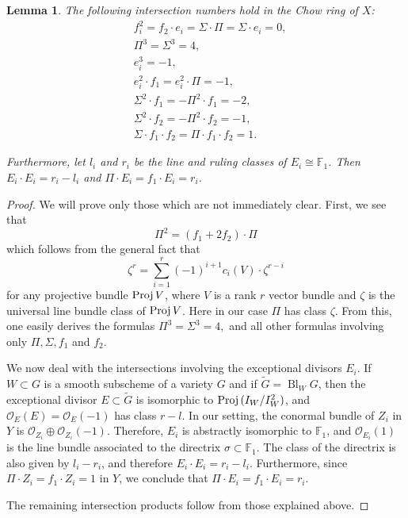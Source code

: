 \documentclass[11]{amsart}
\theoremstyle{plain}
\newtheorem{lemma}[theorem]{Lemma}
\theoremstyle{definition}
\newcommand{\OO}{\mathcal O}
\newcommand{\wt}{\widetilde}
\newcommand{\Bl}{\operatorname{Bl}}
\newcommand{\bbF}{\mathbb F}
\begin{document}
 \begin{lemma}\label{intersections}
 The following intersection numbers hold in the Chow ring of $X$: 
 \begin{eqnarray}\label{eq_int}
 & f_{i}^{2} = f_{2} \cdot e_{i} = \Sigma \cdot \Pi = \Sigma \cdot e_{i} =  0, \nonumber \\
 & \Pi^{3} = \Sigma^{3} = 4, \nonumber \\
 &  e_{i}^{3} = -1, \nonumber \\
 & e_{i}^2 \cdot f_{1} = e_{i}^2 \cdot \Pi = -1, \\ 
 &  \Sigma^2 \cdot f_{1} = -\Pi^2 \cdot f_{1} = -2, \nonumber \\
 &  \Sigma^2 \cdot f_{2} = -\Pi^2 \cdot f_{2} = -1, \nonumber \\
 &   \Sigma \cdot f_{1} \cdot f_{2} = \Pi \cdot f_{1} \cdot f_{2} = 1. \nonumber
 \end{eqnarray}
 
 Furthermore, let $l_{i}$ and $r_{i}$ be the line and ruling classes of $E_{i} \cong \bbF_{1}$.  Then $E_{i}\cdot {E_{i}} = r_{i} - l_{i}$ and $\Pi \cdot E_{i} = f_{1} \cdot E_{i} = r_{i}$. 
 \end{lemma}
 
 \begin{proof}
We will prove only those which are not immediately clear.  First, we see that \[\Pi^2 = (f_{1} + 2f_{2})\cdot \Pi\] which follows from the general fact that \[\zeta^{r} = \sum_{i = 1}^{r} (-1)^{i+1}c_{i}(V) \cdot \zeta^{r-i}\] for any projective bundle ${\rm Proj\,} V$, where $V$ is a rank $r$ vector bundle and $\zeta$ is the universal line bundle class of ${\rm Proj\,} V$. Here in our case $\Pi$ has class $\zeta$. From this, one easily derives the formulas $\Pi^{3} = \Sigma^{3} = 4,$ and all other formulas involving only $\Pi, \Sigma, f_{1}$ and $f_{2}$.

We now deal with the intersections involving the exceptional divisors $E_{i}$. If $W\subset G$ is a smooth subscheme of a variety $G$ and if ${\wt G} = \Bl_{W}G$, then the exceptional divisor $E \subset {\wt G}$ is isomorphic to ${\rm Proj \,} (I_{W}/I^{2}_{W})$, and $\OO_{E}(E) = \OO_{E}(-1)$ has class $r-l$.  In our setting, the conormal bundle of $Z_{i}$ in $Y$ is $\OO_{Z_{i}} \oplus \OO_{Z_{i}}(-1)$.  Therefore, $E_{i}$ is abstractly isomorphic to $\bbF_{1}$, and $\OO_{E_{i}}(1)$ is the line bundle associated to the directrix $\sigma \subset \bbF_{1}$. The class of the directrix is also given by $l_{i} - r_{i}$, and therefore $E_{i} \cdot E_{i} = r_{i} - l_{i}$.  Furthermore, since $\Pi \cdot Z_{i} = f_{1} \cdot Z_{i} =  1$ in $Y$, we conclude that $\Pi \cdot E_{i} = f_{1} \cdot E_{i} = r_{i}$.   

The remaining intersection products follow from those explained above.
 \end{proof}
 
\end{document}
